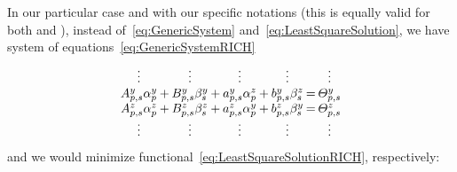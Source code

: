  
In our particular case and with our specific notations (this is equally valid
for both \richone and \richtwo), instead of~\eqref{eq:GenericSystem}
and~\eqref{eq:LeastSquareSolution}, we have system of
equations~\eqref{eq:GenericSystemRICH}
\begin{equation}
  \label{eq:GenericSystemRICH}
  \arraycolsep=1pt
  \begin{array}{*{9}c}
      \vdots                   & & \vdots                  & & \vdots                   & & \vdots                  & & \vdots              \\
      A^y_{p,s}\alpha^y_{p}    &+& B^y_{p,s}\beta^y_s      &+& a^y_{p,s}\alpha^z_{p}    &+& b^y_{p,s}\beta^z_s      &=& \varTheta^y_{p,s}   \\
      A^z_{p,s}\alpha^z_{p}    &+& B^z_{p,s}\beta^z_s      &+& a^z_{p,s}\alpha^y_{p}    &+& b^z_{p,s}\beta^y_s      &=& \varTheta^z_{p,s}   \\
      \vdots                   & & \vdots                  & & \vdots                   & & \vdots                  & & \vdots              \\
  \end{array}
\end{equation}
and we would minimize functional~\eqref{eq:LeastSquareSolutionRICH},
respectively:
